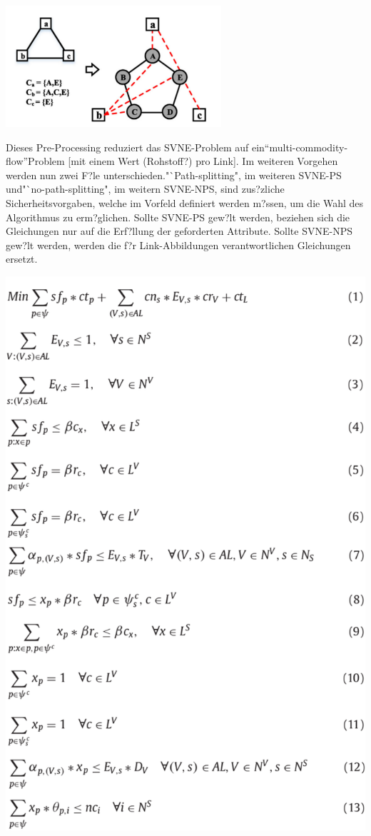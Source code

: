 \documentclass{lni}
\begin{document}
\begin{center}
	\includegraphics[width=0.6\textwidth]{auxgraph.pdf}\newline 
\end{center}
Dieses Pre-Processing reduziert das SVNE-Problem auf ein"`multi-commodity-flow"'Problem [mit einem Wert (Rohstoff?) pro Link]. \cite{MCF}
Im weiteren Vorgehen werden nun zwei F?le unterschieden."`Path-splitting", im weiteren SVNE-PS und"`no-path-splitting", im weitern SVNE-NPS, sind zus?zliche Sicherheitsvorgaben, welche im Vorfeld definiert werden m?ssen, um die Wahl des Algorithmus zu erm?glichen. Sollte SVNE-PS gew?lt werden, beziehen sich die Gleichungen nur auf die Erf?llung der geforderten Attribute.
Sollte SVNE-NPS gew?lt werden, werden die f?r Link-Abbildungen verantwortlichen Gleichungen ersetzt.\newline
\begin{center}
	\includegraphics[width=1\textwidth]{algo.pdf}\newline
\end{center}
\end{document}
